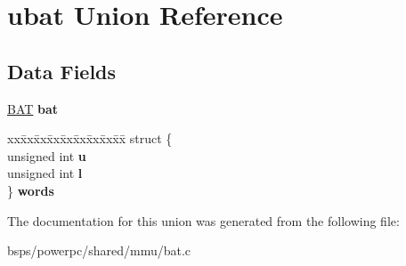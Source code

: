 \hypertarget{unionubat}{}\section{ubat Union Reference}
\label{unionubat}
\subsection*{Data Fields}
\begin{DoxyCompactItemize}
\item 
\mbox{\label{unionubat_a48f9eaf50bf293f2158d157c93129aa2}} 
\mbox{\hyperlink{struct__BAT}{B\+AT}} {\bfseries bat}
\item 
\mbox{\label{unionubat_a33759d80575dbbcd2ce4a8415882e799}} 
\begin{tabbing}
xx\=xx\=xx\=xx\=xx\=xx\=xx\=xx\=xx\=\kill
struct \{\\
\>unsigned int {\bfseries u}\\
\>unsigned int {\bfseries l}\\
\} {\bfseries words}\\

\end{tabbing}\end{DoxyCompactItemize}


The documentation for this union was generated from the following file\+:\begin{DoxyCompactItemize}
\item 
bsps/powerpc/shared/mmu/bat.\+c\end{DoxyCompactItemize}
